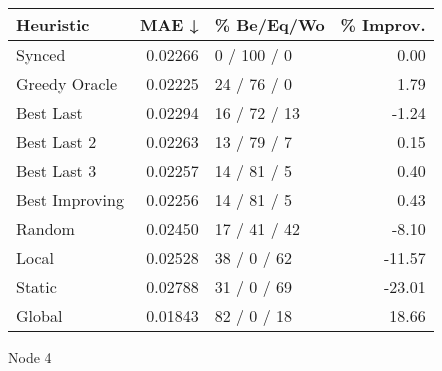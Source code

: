 \begin{tabular}{lrlr}
\toprule
\textbf{Heuristic} & \textbf{MAE ↓} & \textbf{\% Be/Eq/Wo} & \textbf{\% Improv.} \\
\midrule
            Synced &        0.02266 &          0 / 100 / 0 &                0.00 \\
     Greedy Oracle &        0.02225 &          24 / 76 / 0 &                1.79 \\
         Best Last &        0.02294 &         16 / 72 / 13 &               -1.24 \\
       Best Last 2 &        0.02263 &          13 / 79 / 7 &                0.15 \\
       Best Last 3 &        0.02257 &          14 / 81 / 5 &                0.40 \\
    Best Improving &        0.02256 &          14 / 81 / 5 &                0.43 \\
            Random &        0.02450 &         17 / 41 / 42 &               -8.10 \\
             Local &        0.02528 &          38 / 0 / 62 &              -11.57 \\
            Static &        0.02788 &          31 / 0 / 69 &              -23.01 \\
            Global &        0.01843 &          82 / 0 / 18 &               18.66 \\
\bottomrule
\end{tabular}
\caption{Node 4}
\label{tab:iid_lr05_le1_bs2_4}
